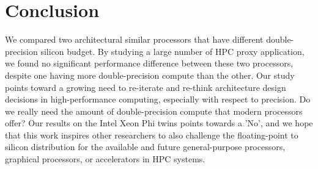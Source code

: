 \section{Conclusion}\label{sec:conclusion}
%

We compared two architectural similar processors that have different double-precision
silicon budget. By studying a large number of HPC proxy application, we found no significant 
performance difference between these two processors, despite one having more double-precision
compute than the other. Our study points toward a growing need to re-iterate and re-think
architecture design decisions in high-performance computing, especially with respect
to precision. 
Do we really need the amount of double-precision compute that modern processors offer?
Our results on the Intel Xeon Phi twins points towards a 'No', and we hope that this
work inspires other researchers to also challenge the floating-point to silicon distribution
for the available and future general-purpose processors, graphical processors, or
accelerators in HPC systems.
